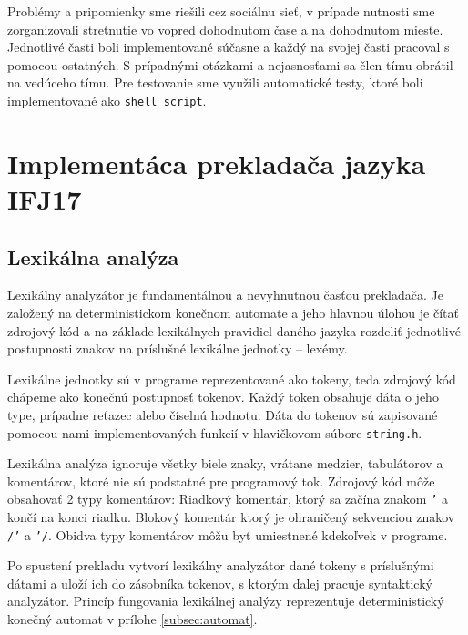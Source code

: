\documentclass[a4paper, 12pt]{article}
\begin{document}
Problémy a pripomienky sme riešili cez sociálnu sieť, v prípade nutnosti sme zorganizovali stretnutie vo vopred dohodnutom čase a na dohodnutom mieste. Jednotlivé časti boli implementované súčasne a každý na svojej časti pracoval s pomocou ostatných. S prípadnými otázkami a nejasnosťami sa člen tímu obrátil na vedúceho tímu. Pre testovanie sme využili automatické testy, ktoré boli implementované ako \texttt{shell script}.  

\newpage

\section{Implementáca prekladača jazyka IFJ17} \label{implementace}



\subsection{Lexikálna analýza} \label{lexer}

Lexikálny analyzátor je fundamentálnou a nevyhnutnou časťou prekladača. Je založený na deterministickom konečnom automate a jeho hlavnou úlohou je čítať zdrojový kód a na základe lexikálnych pravidiel daného jazyka rozdeliť jednotlivé postupnosti znakov na príslušné lexikálne jednotky -- lexémy.

Lexikálne jednotky sú v programe reprezentované ako tokeny, teda zdrojový kód chápeme ako konečnú postupnosť tokenov. Každý token obsahuje dáta o jeho type, prípadne reťazec alebo číselnú hodnotu. Dáta do tokenov sú zapisované pomocou nami implementovaných funkcií v hlavičkovom súbore \texttt{string.h}.

Lexikálna analýza ignoruje všetky biele znaky, vrátane medzier, tabulátorov a komentárov, ktoré nie sú podstatné pre programový tok. Zdrojový kód môže obsahovať 2 typy komentárov: 
Riadkový komentár, ktorý sa začína znakom \texttt{'} a končí na konci riadku. 
Blokový komentár ktorý je ohraničený sekvenciou znakov \texttt{/'} a \texttt{'/}. Obidva typy komentárov môžu byť umiestnené kdekoľvek v programe.

Po spustení prekladu vytvorí lexikálny analyzátor dané tokeny s príslušnými dátami a uloží ich do zásobníka tokenov, s ktorým ďalej pracuje syntaktický analyzátor. Princíp fungovania lexikálnej analýzy reprezentuje deterministický konečný automat v prílohe \ref{subsec:automat}.
\end{document}

